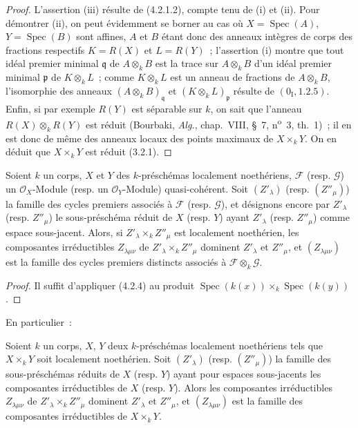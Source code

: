 \begin{proof}
L'assertion (iii) résulte de (4.2.1.2), compte tenu de (i) et (ii). Pour
démontrer (ii), on peut évidemment se borner au cas où
$X=\operatorname{Spec}(A)$, $Y=\operatorname{Spec}(B)$ sont affines, $A$ et
$B$ étant donc des anneaux intègres de corps des fractions respectifs
$K=R(X)$ et $L=R(Y)$~; l'assertion (i) montre que tout idéal premier minimal
$\mathfrak q$ de $A\otimes_k B$ est la trace sur $A\otimes_k B$ d'un idéal
premier minimal $\mathfrak p$ de $K\otimes_k L$~; comme $K\otimes_k L$ est un
anneau de fractions de $A\otimes_k B$, l'isomorphie des anneaux
$(A\otimes_k B)_{\mathfrak q}$ et $(K\otimes_k L)_{\mathfrak p}$ résulte de
$(0_{\mathrm I},1.2.5)$. Enfin, si par exemple $R(Y)$ est séparable sur $k$,
on sait que l'anneau $R(X)\otimes_k R(Y)$ est réduit (Bourbaki,
\emph{Alg.}, chap.~VIII, \S~7, n\textsuperscript{o}~3, th.~1)~; il en est donc
de même des anneaux locaux des points maximaux de $X\times_k Y$. On en déduit
que $X\times_k Y$ est réduit (3.2.1).
\end{proof}

\begin{proposition}[4.2.5]
\label{IV.2.4.2.5-fr}
Soient $k$ un corps, $X$ et $Y$ des $k$-préschémas localement noethériens,
$\mathcal F$ (resp. $\mathcal G$) un $\mathcal O_X$-Module (resp. un
$\mathcal O_Y$-Module) quasi-cohérent. Soit $(Z'_\lambda)$ (resp.
$(Z''_\mu)$) la famille des cycles premiers associés à $\mathcal F$ (resp.
$\mathcal G$), et désignons encore par $Z'_\lambda$ (resp. $Z''_\mu$) le
sous-préschéma réduit de $X$ (resp. $Y$) ayant $Z'_\lambda$ (resp.
$Z''_\mu$) comme espace sous-jacent. Alors, si $Z'_\lambda\times_k Z''_\mu$
est localement noethérien, les composantes irréductibles $Z_{\lambda\mu\nu}$
de $Z'_\lambda\times_k Z''_\mu$ dominent $Z'_\lambda$ et $Z''_\mu$, et
$(Z_{\lambda\mu\nu})$ est la famille des cycles premiers distincts associés à
$\mathcal F\otimes_k\mathcal G$.
\end{proposition}

\begin{proof}
Il suffit d'appliquer (4.2.4) au produit
$\operatorname{Spec}(k(x))\times_k\operatorname{Spec}(k(y))$.
\end{proof}

En particulier~:

\begin{corollary}[4.2.6]
\label{IV.2.4.2.6-fr}
Soient $k$ un corps, $X$, $Y$ deux $k$-préschémas localement noethériens tels
que $X\times_k Y$ soit localement noethérien. Soit $(Z'_\lambda)$ (resp.
$(Z''_\mu)$) la famille des sous-préschémas réduits de $X$ (resp. $Y$) ayant
pour espaces sous-jacents les composantes irréductibles de $X$ (resp. $Y$).
Alors les composantes irréductibles $Z_{\lambda\mu\nu}$ de
$Z'_\lambda\times_k Z''_\mu$ dominent $Z'_\lambda$ et $Z''_\mu$, et
$(Z_{\lambda\mu\nu})$ est la famille des composantes irréductibles de
$X\times_k Y$.
\end{corollary}

